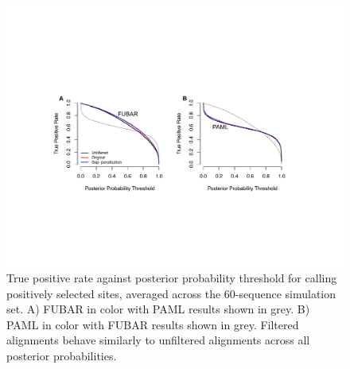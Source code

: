 \documentclass[11pt]{article}
\begin{document}
\begin{figure}[H]
\centerline{\includegraphics[width=5in]{Figures/fulltpr.pdf}}
\caption{\label{fulltpr} True positive rate against posterior probability threshold for calling positively selected sites, averaged across the 60-sequence simulation set. A) FUBAR in color with PAML results shown in grey. B) PAML in color with FUBAR results shown in grey. Filtered alignments behave similarly to unfiltered alignments across all posterior probabilities.}
\end{figure}

\bigskip
\end{document}
